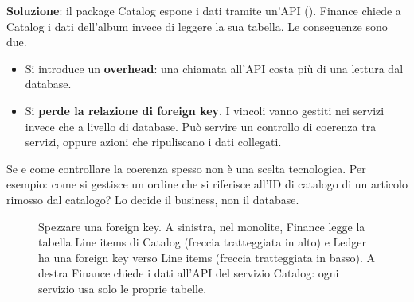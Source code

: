 \textbf{Soluzione}: il package Catalog espone i dati tramite un'API (). Finance chiede a Catalog i
dati dell'album invece di leggere la sua tabella. Le conseguenze sono due.
\begin{itemize}
  \item Si introduce un \textbf{overhead}: una chiamata all'API costa più di una lettura dal database.
  \item Si \textbf{perde la relazione di foreign key}. I vincoli vanno gestiti nei servizi invece che a livello di
    database. Può servire un controllo di coerenza tra servizi, oppure azioni che ripuliscano i dati collegati.
\end{itemize}

\begin{attenzione}
Se e come controllare la coerenza spesso non è una scelta tecnologica. Per esempio: come si gestisce un ordine che
si riferisce all'ID di catalogo di un articolo rimosso dal catalogo? Lo decide il business, non il database.
\end{attenzione}

\begin{figure}[ht]
\centering
{}
\caption{Spezzare una foreign key. A sinistra, nel monolite, Finance legge la tabella Line items di Catalog (freccia
tratteggiata in alto) e Ledger ha una foreign key verso Line items (freccia tratteggiata in basso). A destra Finance
chiede i dati all'API del servizio Catalog: ogni servizio usa solo le proprie tabelle.}
\label{fig:split-fk}
\end{figure}

